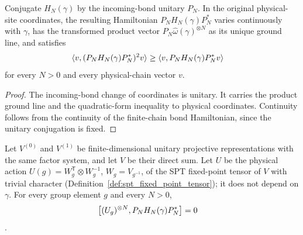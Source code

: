\begin{lemma}
    \label{thm:spt_physical_bond_parent_gap}
    \leanok
    Conjugate $H_N(\gamma)$ by the incoming-bond unitary $P_N$. In the
    original physical-site coordinates, the resulting Hamiltonian
    $P_NH_N(\gamma)P_N^*$ varies continuously with $\gamma$, has the
    transformed product vector $P_N\widehat\omega(\gamma)^{\otimes N}$
    as its unique ground line, and satisfies
    \begin{align}
        \langle v,(P_NH_N(\gamma)P_N^*)^2v\rangle
         & \geq \langle v,P_NH_N(\gamma)P_N^*v\rangle
        \notag
    \end{align}
    for every $N>0$ and every physical-chain vector $v$.
\end{lemma}

\begin{proof}\leanok
    The incoming-bond change of coordinates is unitary. It carries the
    product ground line and the quadratic-form inequality to physical
    coordinates. Continuity follows from the continuity of the
    finite-chain bond Hamiltonian, since the unitary conjugation is fixed.
\end{proof}

\begin{lemma}
    \label{thm:spt_physical_bond_parent_symmetry}
    \leanok
    Let $V^{(0)}$ and $V^{(1)}$ be finite-dimensional unitary projective
    representations with the same factor system, and let $V$ be their
    direct sum. Let $U$ be the physical action
    $U(g)=W_g^{\mathsf T}\otimes W_g^{-1}$, $W_g=V_{g^{-1}}$, of the SPT
    fixed-point tensor of $V$ with trivial character
    (Definition~\ref{def:spt_fixed_point_tensor}); it does not depend on
    $\gamma$. For every group element $g$ and every $N>0$,
    \begin{align}
        \left[(U_g)^{\otimes N},
        P_N H_N(\gamma)P_N^*\right] & =0
        \notag
    \end{align}
    \cite[Section~II.F.2]{Schuch2011Phases}.
\end{lemma}

